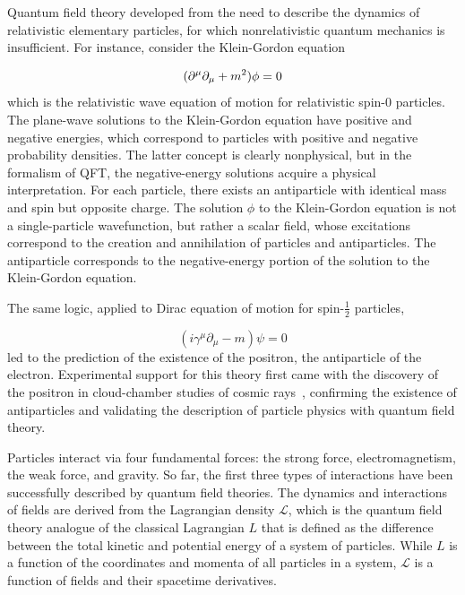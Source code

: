 Quantum field theory developed from the need to describe the dynamics of relativistic elementary particles, for which nonrelativistic quantum mechanics is insufficient. For instance, consider the Klein-Gordon equation

\begin{equation}
(\partial^{\mu}\partial_{\mu} + m^{2})\phi = 0\newline
\label{eq:KG}
\end{equation}
which is the relativistic wave equation of motion for relativistic spin-0 particles. The plane-wave solutions to the Klein-Gordon equation have positive and negative energies, which correspond to particles with positive and negative probability densities. The latter concept is clearly nonphysical, but in the formalism of QFT, the negative-energy solutions acquire a physical interpretation\cite{PeskinSchroederPhysics,ThomsonPhysics}. For each particle, there exists an antiparticle with identical mass and spin but opposite charge. The solution $\phi$ to the Klein-Gordon equation is not a single-particle wavefunction, but rather a scalar field, whose excitations correspond to the creation and annihilation of particles and antiparticles. The antiparticle corresponds to the negative-energy portion of the solution to the Klein-Gordon equation.

The same logic, applied to Dirac equation of motion for spin-$\frac{1}{2}$ particles,

\begin{equation}
(i\gamma^{\mu}\partial_{\mu} - m)\psi = 0
\label{eq:Dirac}
\end{equation}
led to the prediction of the existence of the positron, the antiparticle of the electron. Experimental support for this theory first came with the discovery of the positron in cloud-chamber studies of cosmic rays~\cite{BettiniPhysics}, confirming the existence of antiparticles and validating the description of particle physics with quantum field theory.

Particles interact via four fundamental forces: the strong force, electromagnetism, the weak force, and gravity. So far, the first three types of interactions have been successfully described by quantum field theories. The dynamics and interactions of fields are derived from the Lagrangian density $\mathcal{L}$, which is the quantum field theory analogue of the classical Lagrangian $L$ that is defined as the difference between the total kinetic and potential energy of a system of particles. While $L$ is a function of the coordinates and momenta of all particles in a system, $\mathcal{L}$ is a function of fields and their spacetime derivatives.

